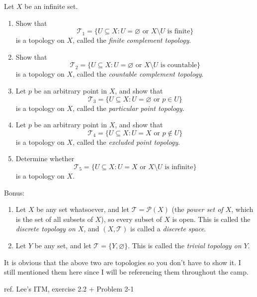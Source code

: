 \documentclass{pset}
\begin{document}
\maketitle

\pagebreak

\begin{problem}
    \noindent Let \( X \) be an infinite set.
    \begin{enumerate}[label=(\alph*)]
        \item Show that
        \[
        \mathcal{T}_1 = \{ U \subseteq X : U = \varnothing \text{ or } X \setminus U \text{ is finite} \}
        \]
        is a topology on \( X \), called the \textit{finite complement topology}.
        
        \item Show that
        \[
        \mathcal{T}_2 = \{ U \subseteq X : U = \varnothing \text{ or } X \setminus U \text{ is countable} \}
        \]
        is a topology on \( X \), called the \textit{countable complement topology}.
        
        \item Let \( p \) be an arbitrary point in \( X \), and show that
        \[
        \mathcal{T}_3 = \{ U \subseteq X : U = \varnothing \text{ or } p \in U \}
        \]
        is a topology on \( X \), called the \textit{particular point topology}.
        
        \item Let \( p \) be an arbitrary point in \( X \), and show that
        \[
        \mathcal{T}_4 = \{ U \subseteq X : U = X \text{ or } p \notin U \}
        \]
        is a topology on \( X \), called the \textit{excluded point topology}.
        
        \item Determine whether
        \[
        \mathcal{T}_5 = \{ U \subseteq X : U = X \text{ or } X \setminus U \text{ is infinite} \}
        \]
        is a topology on \( X \).
    \end{enumerate}
    Bonus: 
    \begin{enumerate}[label=(\roman*)]
        \item Let \( X \) be any set whatsoever, and let \( \mathcal{T} = \mathcal{P}(X) \) (the \textit{power set of \( X \)}, which is the set of 
        all subsets of \( X \)), so every subset of \( X \) is open. This is called the \textit{discrete topology on \( X \)}, and 
        \( (X, \mathcal{T}) \) is called a \textit{discrete space}.
        
        \item Let \( Y \) be any set, and let \( \mathcal{T} = \{Y, \varnothing\} \). This is called the \textit{trivial topology on \( Y \)}.
    \end{enumerate}
    \small It is obvious that the above two are topologies so you don't have to show it. I still mentioned them here since I will be referencing them 
    throughout the camp.

    \noindent\tiny ref. Lee's ITM, exercise 2.2 + Problem 2-1
\end{problem}
\end{document}
